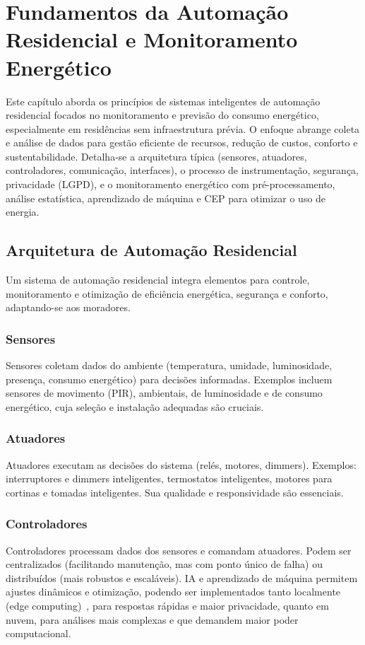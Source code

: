 \chapter[Fundamentos da Automação Residencial]{Fundamentos da Automação Residencial e Monitoramento Energético}
\label{chap:principios}

Este capítulo aborda os princípios de sistemas inteligentes de automação residencial focados no monitoramento e previsão do consumo energético, especialmente em residências sem infraestrutura prévia. O enfoque abrange coleta e análise de dados para gestão eficiente de recursos, redução de custos, conforto e sustentabilidade. Detalha-se a arquitetura típica (sensores, atuadores, controladores, comunicação, interfaces), o processo de instrumentação, segurança, privacidade (LGPD), e o monitoramento energético com pré-processamento, análise estatística, aprendizado de máquina e CEP para otimizar o uso de energia.

\section{Arquitetura de Automação Residencial}
Um sistema de automação residencial integra elementos para controle, monitoramento e otimização de eficiência energética, segurança e conforto, adaptando-se aos moradores.

\subsection{Sensores}
Sensores coletam dados do ambiente (temperatura, umidade, luminosidade, presença, consumo energético) para decisões informadas. Exemplos incluem sensores de movimento (PIR), ambientais, de luminosidade e de consumo energético, cuja seleção e instalação adequadas são cruciais.

\subsection{Atuadores}
Atuadores executam as decisões do sistema (relés, motores, dimmers). Exemplos: interruptores e dimmers inteligentes, termostatos inteligentes, motores para cortinas e tomadas inteligentes. Sua qualidade e responsividade são essenciais.

\subsection{Controladores}
Controladores processam dados dos sensores e comandam atuadores. Podem ser centralizados (facilitando manutenção, mas com ponto único de falha) ou distribuídos (mais robustos e escaláveis). IA e aprendizado de máquina permitem ajustes dinâmicos e otimização, podendo ser implementados tanto localmente (edge computing)~\cite{Shi2016Edge}, para respostas rápidas e maior privacidade, quanto em nuvem, para análises mais complexas e que demandem maior poder computacional.

